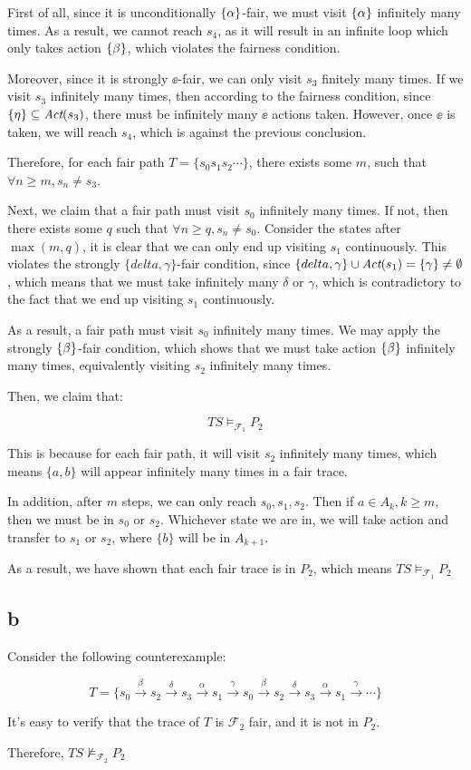 First of all, since it is unconditionally $\{\alpha\}$-fair, we must visit $\{\alpha\}$ infinitely many times.
As a result, we cannot reach $s_4$, as it will result in an infinite loop which only takes action
$\{\beta\}$, which violates the fairness condition.

Moreover, since it is strongly $\ee$-fair, we can only visit $s_3$ finitely many times.
If we visit $s_3$ infinitely many times, then according to the fairness condition,
since $\{\eta\} \subseteq \textit{Act}(s_3)$, there must be infinitely many $\ee$ actions taken.
However, once $\ee$ is taken, we will reach $s_4$, which is against the previous conclusion.

Therefore, for each fair path $T=\{s_0 s_1 s_2 \cdots\}$, there exists some $m$, such that 
$\forall n \ge m, s_n \ne s_3$.

Next, we claim that a fair path must visit $s_0$ infinitely many times.
If not, then there exists some $q$ such that $\forall n \ge q, s_n \ne s_0$.
Consider the states after $\max(m, q)$, it is clear that we can only end up
visiting $s_1$ continuously. This violates the strongly $\{delta, \gamma\}$-fair condition,
since $\{delta, \gamma\} \cup \textit{Act}(s_1) = \{\gamma\} \ne \emptyset$, which means
that we must take infinitely many $\delta$ or $\gamma$, which is contradictory to the fact
that we end up visiting $s_1$ continuously.

As a result, a fair path must visit $s_0$ infinitely many times. We may apply the strongly $\{\beta\}$-fair condition,
which shows that we must take action $\{\beta\}$ infinitely many times, equivalently visiting $s_2$ infinitely many times.

Then, we claim that:

$$
\textit{TS} \models_{\mathcal{F}_1} P_2
$$

This is because for each fair path, it will visit $s_2$ infinitely many times,
which means $\{a, b\}$ will appear infinitely many times in a fair trace.

In addition, after $m$ steps, we can only reach $s_0, s_1, s_2$.
Then if $a \in {A_k}, k \ge m$, then we must be in $s_0$ or $s_2$.
Whichever state we are in, we will take action and transfer to $s_1$ or $s_2$,
where $\{b\}$ will be in $A_{k+1}$.

As a result, we have shown that each fair trace is in $P_2$, which means
$\textit{TS} \models_{\mathcal{F}_1} P_2$

\subsection{b}

Consider the following counterexample:

\newcommand{\xa}{\xrightarrow{\alpha}}
\newcommand{\xb}{\xrightarrow{\beta}}
\newcommand{\xg}{\xrightarrow{\gamma}}
\newcommand{\xd}{\xrightarrow{\delta}}

$$
T = \{s_0 \xb s_2 \xd s_3 \xa s_1 \xg s_0 \xb s_2 \xd s_3 \xa s_1 \xg \cdots\}
$$

It's easy to verify that the trace of $T$ is $\mathcal{F}_2$ fair, and it is not in $P_2$.

Therefore, $\textit{TS} \not\models_{\mathcal{F}_2} P_2$
